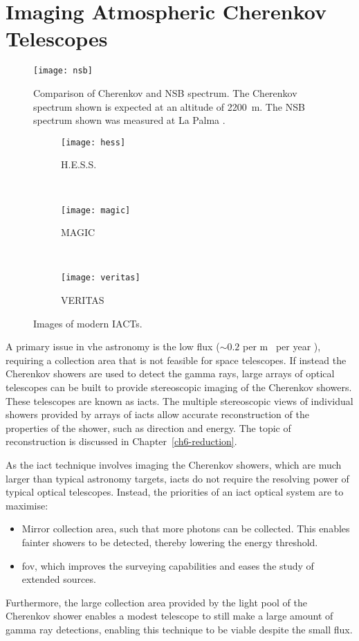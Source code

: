 \section{Imaging Atmospheric Cherenkov Telescopes}

\begin{figure}
	\centering\texttt{[image: nsb]} 
	\caption[Comparison of Cherenkov and NSB spectrum.]{Comparison of Cherenkov and NSB spectrum. The Cherenkov spectrum shown is expected at an altitude of \SI{2200}{m}. The NSB spectrum shown was measured at La Palma \cite{Bouvier2013}.}
	\label{fig:nsb}
\end{figure}

\begin{figure}
	\centering
	\begin{subfigure}[b]{0.35\textwidth}
		\texttt{[image: hess]}
		\caption{H.E.S.S.}
		\label{fig:hess}
	\end{subfigure}
	~
	\begin{subfigure}[b]{0.35\textwidth}
		\texttt{[image: magic]}
		\caption{MAGIC}
		\label{fig:magic}
	\end{subfigure}
	~
	\begin{subfigure}[b]{0.45\textwidth}
		\texttt{[image: veritas]}
		\caption{VERITAS}
		\label{fig:veritas}
	\end{subfigure}
	\caption{Images of modern IACTs.}
	\label{fig:iacts}
\end{figure}

A primary issue in \gls{vhe} astronomy is the low flux (${\sim} 0.2$ per \si{m \squared} per year \cite{Franco2016}), requiring a collection area that is not feasible for space telescopes. If instead the Cherenkov showers are used to detect the gamma rays, large arrays of optical telescopes can be built to provide stereoscopic imaging of the Cherenkov showers. These telescopes are known as \glspl{iact}. The multiple stereoscopic views of individual showers provided by arrays of \glspl{iact} allow accurate reconstruction of the properties of the shower, such as direction and energy. The topic of reconstruction is discussed in Chapter~\ref{ch6-reduction}.

As the \gls{iact} technique involves imaging the Cherenkov showers, which are much larger than typical astronomy targets, \glspl{iact} do not require the resolving power of typical optical telescopes. Instead, the priorities of an \gls{iact} optical system are to maximise: 
\begin{itemize}
\item Mirror collection area, such that more photons can be collected. This enables fainter showers to be detected, thereby lowering the energy threshold.
\item \gls{fov}, which improves the surveying capabilities and eases the study of extended sources.
\end{itemize}
Furthermore, the large collection area provided by the light pool of the Cherenkov shower enables a modest telescope to still make a large amount of gamma ray detections, enabling this technique to be viable despite the small flux.


